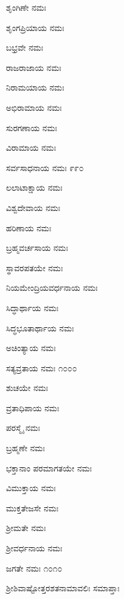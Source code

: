 ಶೃಂಗಿಣೇ ನಮಃ

ಶೃಂಗಪ್ರಿಯಾಯ ನಮಃ

ಬಭ್ರವೇ ನಮಃ

ರಾಜರಾಜಾಯ ನಮಃ

ನಿರಾಮಯಾಯ ನಮಃ

ಅಭಿರಾಮಾಯ ನಮಃ

ಸುರಗಣಾಯ ನಮಃ

ವಿರಾಮಾಯ ನಮಃ

ಸರ್ವಸಾಧನಾಯ ನಮಃ \num{೯೯೦}

ಲಲಾಟಾಕ್ಷಾಯ ನಮಃ

ವಿಶ್ವದೇವಾಯ ನಮಃ

ಹರಿಣಾಯ ನಮಃ

ಬ್ರಹ್ಮವರ್ಚಸಾಯ ನಮಃ

ಸ್ಥಾವರಪತಯೇ ನಮಃ

ನಿಯಮೇಂದ್ರಿಯವರ್ಧನಾಯ ನಮಃ

ಸಿದ್ಧಾರ್ಥಾಯ ನಮಃ

ಸಿದ್ಧಭೂತಾರ್ಥಾಯ ನಮಃ

ಅಚಿಂತ್ಯಾಯ ನಮಃ

ಸತ್ಯವ್ರತಾಯ ನಮಃ \num{೧೦೦೦}

ಶುಚಯೇ ನಮಃ

ವ್ರತಾಧಿಪಾಯ ನಮಃ

ಪರಸ್ಮೈ ನಮಃ

ಬ್ರಹ್ಮಣೇ ನಮಃ

ಭಕ್ತಾನಾಂ ಪರಮಾಗತಯೇ ನಮಃ

ವಿಮುಕ್ತಾಯ ನಮಃ

ಮುಕ್ತತೇಜಸೇ ನಮಃ

ಶ್ರೀಮತೇ ನಮಃ

ಶ್ರೀವರ್ಧನಾಯ ನಮಃ

ಜಗತೇ ನಮಃ \num{೧೦೧೦}

\begin{center}
ಶ್ರೀಶಿವಾಷ್ಟೋತ್ತರಶತನಾಮಾವಲಿಃ ಸಮಾಪ್ತಾಃ 
\end{center}

